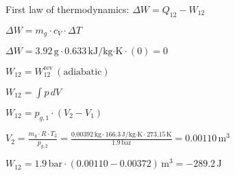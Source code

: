 First law of thermodynamics:  
\( \Delta W = Q_{12} - W_{12} \)  

\( \Delta W = m_g \cdot c_V \cdot \Delta T \)  

\( \Delta W = 3.92 \, \text{g} \cdot 0.633 \, \text{kJ/kg·K} \cdot (0) = 0 \)  

\( W_{12} = W_{12}^{\text{rev}} \, (\text{adiabatic}) \)  

\( W_{12} = \int p \, dV \)  

\( W_{12} = p_{g,1} \cdot (V_2 - V_1) \)  

\( V_2 = \frac{m_g \cdot R \cdot T_2}{p_{g,2}} = \frac{0.00392 \, \text{kg} \cdot 166.3 \, \text{J/kg·K} \cdot 273.15 \, \text{K}}{1.9 \, \text{bar}} = 0.00110 \, \text{m}^3 \)  

\( W_{12} = 1.9 \, \text{bar} \cdot (0.00110 - 0.00372) \, \text{m}^3 = -289.2 \, \text{J} \)